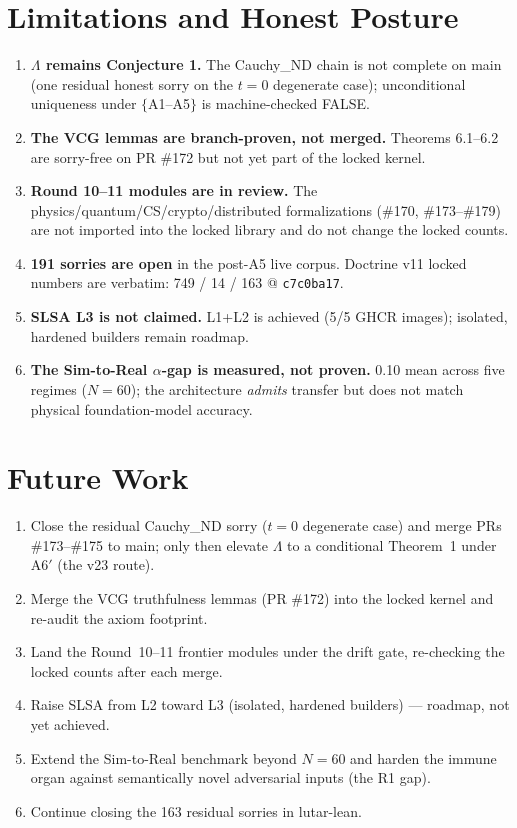 \documentclass[11pt]{article}
\theoremstyle{plain}
\theoremstyle{definition}
\theoremstyle{remark}
\newcommand{\La}{\Lambda}
\begin{document}
\section{Limitations and Honest Posture}

\begin{enumerate}[leftmargin=1.4em]
\item \textbf{$\La$ remains Conjecture 1.} The Cauchy\_ND chain is not complete on
main (one residual honest sorry on the $t=0$ degenerate case); unconditional
uniqueness under $\{$A1--A5$\}$ is machine-checked FALSE.
\item \textbf{The VCG lemmas are branch-proven, not merged.} Theorems 6.1--6.2 are
sorry-free on PR \#172 but not yet part of the locked kernel.
\item \textbf{Round 10--11 modules are in review.} The physics/quantum/CS/crypto/distributed
formalizations (\#170, \#173--\#179) are not imported into the locked library and do
not change the locked counts.
\item \textbf{191 sorries are open} in the post-A5 live corpus. Doctrine v11 locked
numbers are verbatim: 749 / 14 / 163 @ \texttt{c7c0ba17}.
\item \textbf{SLSA L3 is not claimed.} L1+L2 is achieved (5/5 GHCR images); isolated,
hardened builders remain roadmap.
\item \textbf{The Sim-to-Real $\alpha$-gap is measured, not proven.} 0.10 mean across
five regimes ($N=60$); the architecture \emph{admits} transfer but does not match
physical foundation-model accuracy.
\end{enumerate}

\section{Future Work}

\begin{enumerate}[leftmargin=1.4em]
\item Close the residual Cauchy\_ND sorry ($t=0$ degenerate case) and merge PRs
\#173--\#175 to main; only then elevate $\La$ to a conditional Theorem~1 under A6$'$
(the v23 route).
\item Merge the VCG truthfulness lemmas (PR \#172) into the locked kernel and re-audit
the axiom footprint.
\item Land the Round~10--11 frontier modules under the drift gate, re-checking the
locked counts after each merge.
\item Raise SLSA from L2 toward L3 (isolated, hardened builders) --- roadmap, not yet achieved.
\item Extend the Sim-to-Real benchmark beyond $N=60$ and harden the immune organ
against semantically novel adversarial inputs (the R1 gap).
\item Continue closing the 163 residual sorries in lutar-lean.
\end{enumerate}
\end{document}
